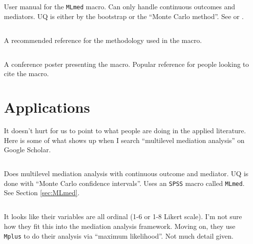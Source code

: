\documentclass{article}
\begin{document}
User manual for the \texttt{MLmed} macro. Can only handle continuous outcomes and mediators. UQ is either by the bootstrap or the ``Monte Carlo method''. See \citet{Pre12} or \citet{Wil08}.

\subsection{\citet{Hay20}}

A recommended reference for the methodology used in the macro.

\subsection{\citet{Roc17}}

A conference poster presenting the macro. Popular reference for people looking to cite the macro.


\section{Applications}

It doesn't hurt for us to point to what people are doing in the applied literature. Here is some of what shows up when I search ``multilevel mediation analysis'' on Google Scholar.

\subsection{\citet{Vea19}}

Does multilevel mediation analysis with continuous outcome and mediator. UQ is done with ``Monte Carlo confidence intervals''. Uses an \texttt{SPSS} macro called \texttt{MLmed}. See Section \ref{sec:MLmed}.

\subsection{\citet{Ara21}}

It looks like their variables are all ordinal (1-6 or 1-8 Likert scale). I'm not sure how they fit this into the mediation analysis framework. Moving on, they use \texttt{Mplus} to do their analysis via ``maximum likelihood''. Not much detail given.

\subsection{\citet{Hwa12}}
\end{document}
